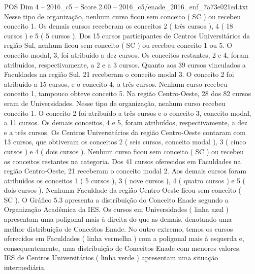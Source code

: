 \begin{textsample}{POS Dim 4 – 2016\_c5 – Score 2.00 – 2016\_c5/enade\_2016\_enf\_7a73e021ed.txt}
Nesse tipo de organização, nenhum curso ficou sem conceito ( SC ) ou recebeu conceito 1.
Os demais cursos receberam os conceitos 2 ( três cursos ), 4 ( 18 cursos ) e 5 ( 5 cursos ).
Dos 15 cursos participantes de Centros Universitários da região Sul, nenhum ficou sem conceito ( SC ) ou recebeu conceito 1 ou 5.
O conceito modal, 3, foi atribuído a dez cursos.
Os conceitos restantes, 2 e 4, foram atribuídos, respectivamente, a 2 e a 3 cursos.
Quanto aos 39 cursos vinculados a Faculdades na região Sul, 21 receberam o conceito modal 3.
O conceito 2 foi atribuído a 15 cursos, e o conceito 4, a três cursos.
Nenhum curso recebeu conceito 1, tampouco obteve conceito 5.
Na região Centro-Oeste, 28 dos 82 cursos eram de Universidades.
Nesse tipo de organização, nenhum curso recebeu conceito 1.
O conceito 2 foi atribuído a três cursos e o conceito 3, conceito modal, a 11 cursos.
Os demais conceitos, 4 e 5, foram atribuídos, respectivamente, a dez e a três cursos.
Os Centros Universitários da região Centro-Oeste contaram com 13 cursos, que obtiveram os conceitos 2 ( seis cursos, conceito modal ), 3 ( cinco cursos ) e 4 ( dois cursos ).
Nenhum curso ficou sem conceito ( SC ) ou recebeu os conceitos restantes na categoria.
Dos 41 cursos oferecidos em Faculdades na região Centro-Oeste, 21 receberam o conceito modal 2.
Aos demais cursos foram atribuídos os conceitos 1 ( 5 cursos ), 3 ( nove cursos ), 4 ( quatro cursos ) e 5 ( dois cursos ).
Nenhuma Faculdade da região Centro-Oeste ficou sem conceito ( SC ).
O Gráfico 5.3 apresenta a distribuição do Conceito Enade segundo a Organização Acadêmica da IES.
Os cursos em Universidades ( linha azul ) apresentam uma poligonal mais à direita do que as demais, denotando uma melhor distribuição de Conceitos Enade.
No outro extremo, temos os cursos oferecidos em Faculdades ( linha vermelha ) com a poligonal mais à esquerda e, consequentemente, uma distribuição de Conceitos Enade com menores valores.
IES de Centros Universitários ( linha verde ) apresentam uma situação intermediária.

\end{textsample}
